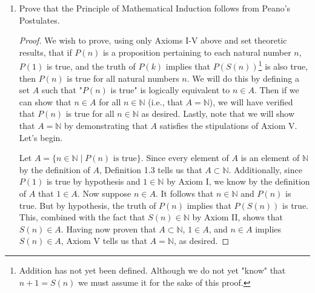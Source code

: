 \documentclass[titlepage]{article}
\theoremstyle{definition}
\newcommand{\N}{\mathbb{N}}
\begin{document}
\begin{enumerate}
\begin{enumerate}[label={(\alph*)}]
\begin{proof}
        \end{proof}
        \item Prove that the Principle of Mathematical Induction follows from Peano's Postulates.
        \begin{proof}
            We wish to prove, using only Axioms I-V above and set theoretic results, that if $P(n)$ is a proposition pertaining to each natural number $n$, $P(1)$ is true, and the truth of $P(k)$ implies that $P(S(n))$\footnote{Addition has not yet been defined. Although we do not yet "know" that $n+1=S(n)$ we must assume it for the sake of this proof.} is also true, then $P(n)$ is true for all natural numbers $n$. We will do this by defining a set $A$ such that "$P(n)$ is true" is logically equivalent to $n\in A$. Then if we can show that $n\in A$ for all $n\in\N$ (i.e., that $A=\N$), we will have verified that $P(n)$ is true for all $n\in\N$ as desired. Lastly, note that we will show that $A=\N$ by demonstrating that $A$ satisfies the stipulations of Axiom V. Let's begin.\par
            Let $A=\{n\in\N\mid P(n)\text{ is true}\}$. Since every element of $A$ is an element of $\N$ by the definition of $A$, Definition 1.3 tells us that $A\subset\N$. Additionally, since $P(1)$ is true by hypothesis and $1\in\N$ by Axiom I, we know by the definition of $A$ that $1\in A$. Now suppose $n\in A$. It follows that $n\in\N$ and $P(n)$ is true. But by hypothesis, the truth of $P(n)$ implies that $P(S(n))$ is true. This, combined with the fact that $S(n)\in\N$ by Axiom II, shows that $S(n)\in A$. Having now proven that $A\subset\N$, $1\in A$, and $n\in A$ implies $S(n)\in A$, Axiom V tells us that $A=\N$, as desired.
        \end{proof}
    \end{enumerate}
\end{enumerate}
\end{document}
